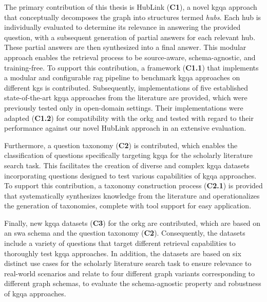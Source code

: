 The primary contribution of this thesis is HubLink (\textbf{C1}), a novel \gls{kgqa} approach that conceptually decomposes the graph into structures termed \emph{hubs}. Each hub is individually evaluated to determine its relevance in answering the provided question, with a subsequent generation of partial answers for each relevant hub. These partial answers are then synthesized into a final answer. This modular approach enables the retrieval process to be source-aware, schema-agnostic, and training-free. To support this contribution, a framework (\textbf{C1.1}) that implements a modular and configurable \gls{rag} pipeline to benchmark \gls{kgqa} approaches on different \glspl{kg} is contributed. Subsequently, implementations of five established state-of-the-art \gls{kgqa} approaches from the literature are provided, which were previously tested only in open-domain settings. Their implementations were adapted (\textbf{C1.2}) for compatibility with the \gls{orkg} and tested with regard to their performance against our novel HubLink approach in an extensive evaluation.

Furthermore, a question taxonomy (\textbf{C2}) is contributed, which enables the classification of questions specifically targeting \gls{kgqa} for the scholarly literature search task. This facilitates the creation of diverse and complex \gls{kgqa} datasets incorporating questions designed to test various capabilities of \gls{kgqa} approaches. To support this contribution, a taxonomy construction process (\textbf{C2.1}) is provided that systematically synthesizes knowledge from the literature and operationalizes the generation of taxonomies, complete with tool support for easy application.

Finally, new \gls{kgqa} datasets (\textbf{C3}) for the \gls{orkg} are contributed, which are based on an \gls{swa} schema and the question taxonomy (\textbf{C2}). Consequently, the datasets include a variety of questions that target different retrieval capabilities to thoroughly test \gls{kgqa} approaches. In addition, the datasets are based on six distinct use cases for the scholarly literature search task to ensure relevance to real-world scenarios and relate to four different graph variants corresponding to different graph schemas, to evaluate the schema-agnostic property and robustness of \gls{kgqa} approaches.





